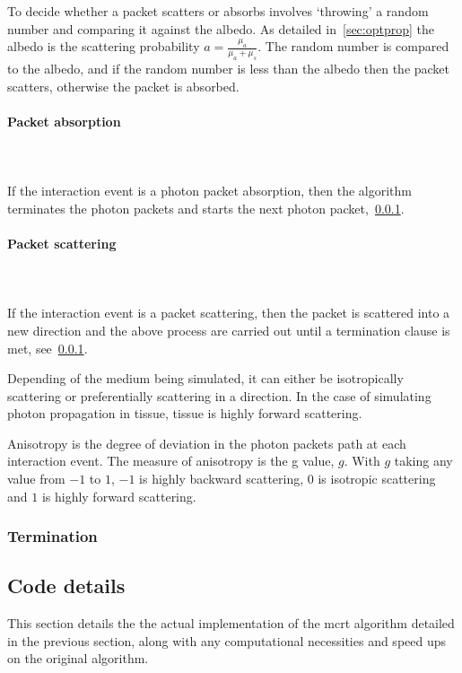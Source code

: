 To decide whether a packet scatters or absorbs involves `throwing' a random number and comparing it against the albedo. As detailed in~\cref{sec:optprop} the albedo is the scattering probability $a=\tfrac{\mu_a}{\mu_a+\mu_s}$. The random number is compared to the albedo, and if the random number is less than the albedo then the packet scatters, otherwise the packet is absorbed.

\paragraph{Packet absorption}\hspace{0pt}\\
\\
If the interaction event is a photon packet absorption, then the algorithm terminates the photon packets and starts the next photon packet,~\cref{sec:terminator}.

\paragraph{Packet scattering}\hspace{0pt}\\
\\
If the interaction event is a packet scattering, then the packet is scattered into a new direction and the above process are carried out until a termination clause is met, see~\cref{sec:terminator}.

Depending of the medium being simulated, it can either be isotropically scattering or preferentially scattering in a direction. In the case of simulating photon propagation in tissue, tissue is highly forward scattering.

Anisotropy is the degree of deviation in the photon packets path at each interaction event. The measure of anisotropy is the g value, $g$. With $g$ taking any value from $-1$ to $1$, $-1$ is highly backward scattering, $0$ is isotropic scattering and $1$ is highly forward scattering. 


\subsubsection{Termination}\label{sec:terminator}

\subsection{Code details}

This section details the the actual implementation of the \gls{mcrt} algorithm detailed in the previous section, along with any computational necessities and speed ups on the original algorithm.

